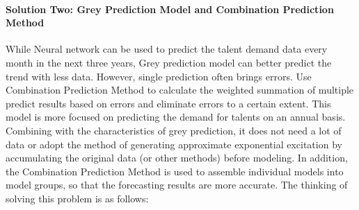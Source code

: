 \documentclass{mcmthesis}
\begin{document}
\paragraph{Solution Two: Grey Prediction Model and Combination Prediction Method}
\par\noindent
\par\noindent
While Neural network can be used to predict the talent demand data every month in the next three years, Grey prediction model can better predict the trend with less data. However, single prediction often brings errors. Use Combination Prediction Method to calculate the weighted summation of multiple predict results based on errors and eliminate errors to a certain extent. This model is more focused on predicting the demand for talents on an annual basis. Combining with the characteristics of grey prediction, it does not need a lot of data or adopt the method of generating approximate exponential excitation by accumulating the original data (or other methods) before modeling. In addition, the Combination Prediction Method is used to assemble individual models into model groups, so that the forecasting results are more accurate. The thinking of solving this problem is as follows:
\end{document}
